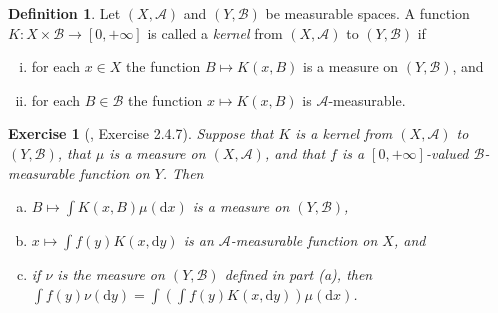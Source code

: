\documentclass[11pt]{article}
\theoremstyle{plain}
\newtheorem{exercise}{Exercise}
\theoremstyle{definition}
\newtheorem{definition}{Definition}
\theoremstyle{remark}
\begin{document}
\begin{definition}
    Let $(X,\mathscr A)$ and $(Y, \mathscr B)$ be measurable spaces.
    A function $K: X \times \mathscr B \to [0, +\infty]$ is called a \emph{kernel} from $(X,\mathscr A)$ to $(Y, \mathscr B)$ if
    \begin{enumerate}[(i)]
        \item 
            for each $x \in X$ the function $B\mapsto K(x,B)$ is a measure on $(Y, \mathscr B)$, and
        \item
            for each $B \in \mathscr B$ the function $x \mapsto K(x, B)$ is $\mathscr A$-measurable.
    \end{enumerate}
\end{definition}
\begin{exercise}[\cite{book:992991}, Exercise 2.4.7]
    Suppose that $K$ is a kernel from $(X, \mathscr A)$ to $(Y, \mathscr B)$, that $ \mu$ is a measure on $(X, \mathscr A)$, and that $f$ is a $[0,+\infty]$-valued $\mathscr B$-measurable function on $Y$. Then
    \begin{enumerate}[(a)]
        \item 
            $B\mapsto \int K(x,B)\mu(\mathrm d x)$ is a measure on $(Y, \mathscr B)$,
        \item
            $x\mapsto \int f(y) K(x, \mathrm d y)$ is an $\mathscr A$-measurable function on $X$, and
        \item
            if $\nu$ is the measure on $(Y, \mathscr B)$ defined in part (a), then $\int f(y) \nu(\mathrm d y) = \int (\int f(y) K(x, \mathrm d y)) \mu (\mathrm d x)$.
    \end{enumerate}
\end{exercise}
\end{document}
